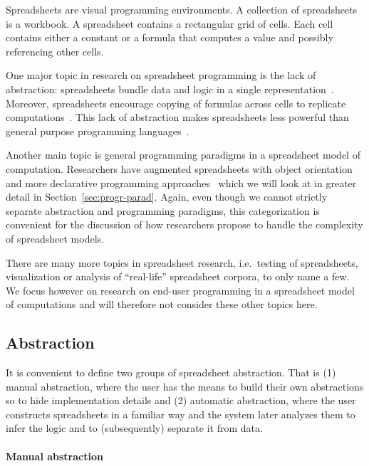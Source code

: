 \documentclass[a4paper]{article}
\begin{document}
Spreadsheets are visual programming environments. A collection of
spreadsheets is a workbook. A spreadsheet contains a rectangular grid
of cells. Each cell contains either a constant or a formula that
computes a value and possibly referencing other cells.

One major topic in research on spreadsheet programming is the lack of
abstraction: spreadsheets bundle data and logic in a single
representation~\cite{Isakowitz:1995:TLT:195705.195708}. Moreover,
spreadsheets encourage copying of formulas across cells to replicate
computations~\cite{1173080, Benfield:2009:FFD:1668113.1668121}. This
lack of abstraction makes spreadsheets less powerful than general
purpose programming languages~\cite{Miller:2015:SPB:2814189.2814201}.

Another main topic is general programming paradigms in a spreadsheet
model of computation. Researchers have augmented spreadsheets with
object orientation~\cite{Benfield:2009:FFD:1668113.1668121} and more
declarative programming
approaches~\cite{Stadelmann:1993:SBC:168642.168664,
  Singh:2016:TSD:2837614.2837668} which we will look at in greater
detail in Section~\ref{sec:progr-parad}. Again, even though we cannot
strictly separate abstraction and programming paradigms, this
categorization is convenient for the discussion of how researchers
propose to handle the complexity of spreadsheet models.

There are many more topics in spreadsheet research, i.e.\ testing of
spreadsheets, visualization or analysis of ``real-life'' spreadsheet
corpora, to only name a few. We focus however on research on end-user
programming in a spreadsheet model of computations and will therefore
not consider these other topics here.

\subsection{Abstraction}
\label{sec:abstraction}

It is convenient to define two groups of spreadsheet abstraction. That
is (1) manual abstraction, where the user has the means to build their
own abstractions so to hide implementation details and (2) automatic
abstraction, where the user constructs spreadsheets in a familiar way
and the system later analyzes them to infer the logic and to
(subsequently) separate it from data.

\paragraph{Manual abstraction}
\end{document}
